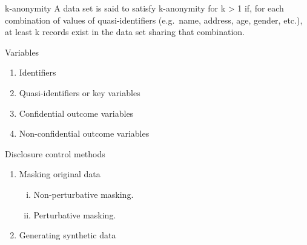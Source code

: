 \documentclass[
  ignorenonframetext,
  aspectratio=169,
]{beamer}
\providecommand{\tightlist}{%
  \setlength{\itemsep}{0pt}\setlength{\parskip}{0pt}}\usepackage{longtable,booktabs,array}
\begin{document}
\begin{frame}{k-anonymity}
\protect\hypertarget{k-anonymity}{}
A data set is said to satisfy k-anonymity for k \textgreater{} 1 if, for
each combination of values of quasi-identifiers (e.g.~name, address,
age, gender, etc.), at least k records exist in the data set sharing
that combination.
\end{frame}

\begin{frame}{Variables}
\protect\hypertarget{variables}{}
\begin{enumerate}
\tightlist
\item
  Identifiers
\item
  Quasi-identifiers or key variables
\item
  Confidential outcome variables
\item
  Non-confidential outcome variables
\end{enumerate}
\end{frame}

\begin{frame}{Disclosure control methods}
\protect\hypertarget{disclosure-control-methods}{}
\begin{enumerate}
\tightlist
\item
  Masking original data

  \begin{enumerate}
  [i.]
  \tightlist
  \item
    Non-perturbative masking.
  \item
    Perturbative masking.
  \end{enumerate}
\item
  Generating synthetic data
\end{enumerate}
\end{frame}
\end{document}
